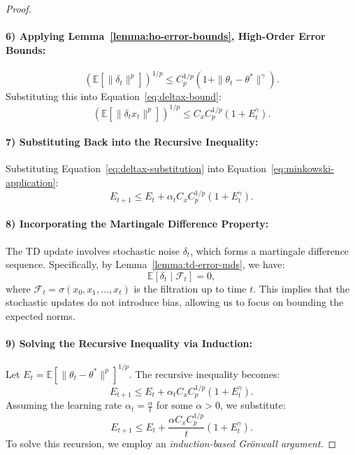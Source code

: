 \begin{proof}
\paragraph{6) Applying Lemma~\ref{lemma:ho-error-bounds}, High-Order Error Bounds:}
\[
\left( \mathbb{E}\left[\|\delta_t\|^p\right] \right)^{1/p} \leq C_p^{1/p} \left( 1 + \|\theta_t - \theta^*\|^{\gamma} \right).
\]
Substituting this into Equation~\eqref{eq:deltax-bound}:
\begin{equation}
\label{eq:deltax-substitution}
\left( \mathbb{E}\left[\|\delta_t x_t\|^p\right] \right)^{1/p} \leq C_x C_p^{1/p} \left( 1 + E_t^{\gamma} \right).
\end{equation}

\paragraph{7) Substituting Back into the Recursive Inequality:}  
Substituting Equation~\eqref{eq:deltax-substitution} into Equation~\eqref{eq:minkowski-application}:
\[
E_{t+1} \leq E_t + \alpha_t C_x C_p^{1/p} \left( 1 + E_t^{\gamma} \right).
\]
\label{eq:recursive-inequality}

\paragraph{8) Incorporating the Martingale Difference Property:}  
The TD update involves stochastic noise \( \delta_t \), which forms a martingale difference sequence. Specifically, by Lemma~\ref{lemma:td-error-mds}, we have:
\[
\mathbb{E}\left[ \delta_t \mid \mathcal{F}_t \right] = 0,
\]
where \( \mathcal{F}_t = \sigma(x_0, x_1, \dots, x_t) \) is the filtration up to time \( t \). This implies that the stochastic updates do not introduce bias, allowing us to focus on bounding the expected norms.

\paragraph{9) Solving the Recursive Inequality via Induction:}  
Let \( E_t = \mathbb{E}\left[\|\theta_t - \theta^*\|^p\right]^{1/p} \). The recursive inequality becomes:
\[
E_{t+1} \leq E_t + \alpha_t C_x C_p^{1/p} \left(1 + E_t^{\gamma}\right).
\]
Assuming the learning rate \( \alpha_t = \frac{\alpha}{t} \) for some \( \alpha > 0 \), we substitute:
\[
E_{t+1} \leq E_t + \frac{\alpha C_x C_p^{1/p}}{t} \left(1 + E_t^{\gamma}\right).
\]
To solve this recursion, we employ an \emph{induction-based Grönwall argument}.


\end{proof}
